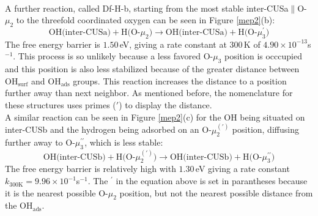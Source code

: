 \documentclass[11pt,DIV=13,BCOR=5mm,a4paper,headinclude]{scrbook}
\begin{document}
\\
A further reaction, called Df-H-b, starting from the most stable inter-CUSa$\parallel$O-$\mu_2$ to the threefold coordinated oxygen can be seen in Figure \ref{mep2}(b):
\begin{equation}
 \text{OH(inter-CUSa)} + \text{H(O-$\mu_2$)} \rightarrow \text{OH(inter-CUSa)} + \text{H(O-$\mu_3^\prime$)} \tag{Df-H-b}
     \label{diffHb}
\end{equation}
The free energy barrier is $1.50\,$eV, giving a rate constant at $300\,$K of $4.90\times 10^{-13}$s$^{-1}$.
This process is so unlikely because a less favored O-$\mu_3$ position is occcupied and this position is also less stabilized because of the greater distance between OH$_{\text{surf}}$ and OH$_{\text{ads}}$ groups.
This reaction increases the distance to a position further away than next neighbor.
As mentioned before, the nomenclature for these structures uses primes ($\prime$) to display the distance.
\\
A similar reaction can be seen in Figure \ref{mep2}(c) for the OH being situated on inter-CUSb and the hydrogen being adsorbed on an O-$\mu_2^{(\prime)}$ position, diffusing further away to O-$\mu_3^{\prime\prime}$, which is less stable:
\begin{equation}
 \text{OH(inter-CUSb)} + \text{H(O-$\mu_2^{(\prime)}$)} \rightarrow \text{OH(inter-CUSb)} + \text{H(O-$\mu_3^{\prime\prime}$)} \tag{Df-H-c}
     \label{diffHc}
\end{equation}
The free energy barrier is relatively high with $1.30\,$eV giving a rate constant $k_\textrm{300K}=9.96\times 10^{-1}$s$^{-1}$.
The $^\prime$ in the equation above is set in parantheses because it is the nearest possible O-$\mu_2$ position, but not the nearest possible distance from the OH$_\textrm{ads}$.
\end{document}
